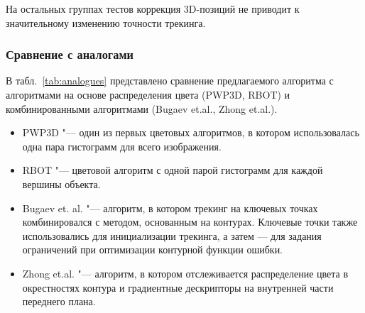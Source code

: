 На остальных группах тестов коррекция 3D-позиций не приводит к значительному
изменению точности трекинга.



\subsubsection{Сравнение с аналогами}

В табл.~\ref{tab:analogues} представлено сравнение предлагаемого алгоритма с
алгоритмами на основе распределения цвета (PWP3D, RBOT) и комбинированными
алгоритмами (Bugaev et.al., Zhong et.al.).

\begin{itemize}
\item PWP3D "--- один из первых цветовых алгоритмов, в котором использовалась
одна пара гистограмм для всего изображения.
\item RBOT "--- цветовой алгоритм с одной парой гистограмм для каждой вершины
объекта.
\item Bugaev et. al. "--- алгоритм, в котором трекинг на ключевых точках
комбинировался с методом, основанным на контурах. Ключевые точки также
использовались для инициализации трекинга, а затем --- для задания
ограничений при оптимизации контурной функции ошибки.
\item Zhong et.al. "--- алгоритм, в котором отслеживается распределение цвета в
окрестностях контура и градиентные дескрипторы на внутренней части переднего
плана.
\end{itemize}

